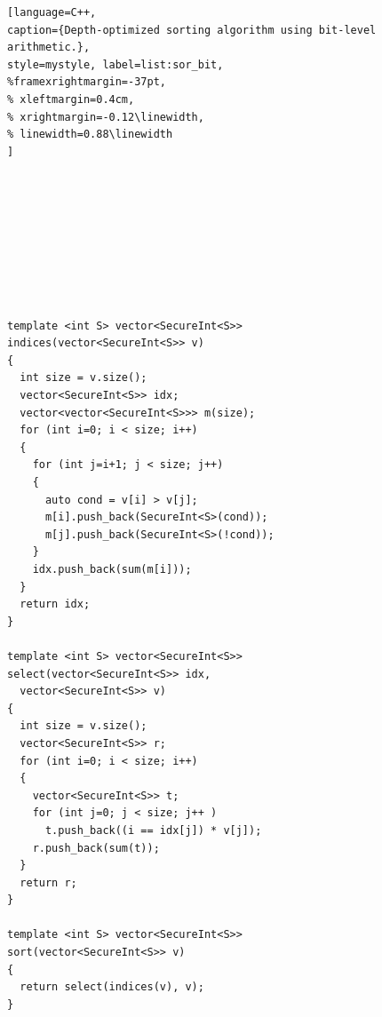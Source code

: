 \begin{figure}[t]
\begin{minipage}{\linewidth}
\begin{lstlisting}[language=C++,
caption={Depth-optimized sorting algorithm using bit-level arithmetic.},
style=mystyle, label=list:sor_bit,
%framexrightmargin=-37pt,
% xleftmargin=0.4cm,
% xrightmargin=-0.12\linewidth,
% linewidth=0.88\linewidth
]









template <int S> vector<SecureInt<S>>
indices(vector<SecureInt<S>> v)
{
  int size = v.size();
  vector<SecureInt<S>> idx;
  vector<vector<SecureInt<S>>> m(size);
  for (int i=0; i < size; i++)
  {
    for (int j=i+1; j < size; j++)
    {
      auto cond = v[i] > v[j];
      m[i].push_back(SecureInt<S>(cond));
      m[j].push_back(SecureInt<S>(!cond));
    }
    idx.push_back(sum(m[i]));
  }
  return idx;
}

template <int S> vector<SecureInt<S>>
select(vector<SecureInt<S>> idx,
  vector<SecureInt<S>> v)
{
  int size = v.size();
  vector<SecureInt<S>> r;
  for (int i=0; i < size; i++)
  {
    vector<SecureInt<S>> t;
    for (int j=0; j < size; j++ )
      t.push_back((i == idx[j]) * v[j]);
    r.push_back(sum(t));
  }
  return r;
}

template <int S> vector<SecureInt<S>>
sort(vector<SecureInt<S>> v)
{
  return select(indices(v), v);
}

\end{lstlisting}
\end{minipage}
\end{figure}

